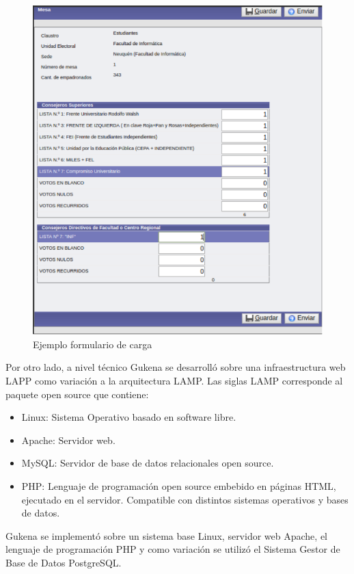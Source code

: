 \begin{figure}[h!]
  \includegraphics[width=\textwidth]{img/jvFvvu4LpJ.png}
  \caption{Ejemplo formulario de carga}
  \label{graf:formularioGukena}
\end{figure}

Por otro lado, a nivel técnico Gukena se desarrolló sobre una infraestructura web LAPP como variación a la arquitectura LAMP. Las siglas LAMP corresponde al paquete open source  \cite{chaparro2006lamp} que contiene: 
\begin{itemize}
    \item Linux: Sistema Operativo basado en software libre.
    \item Apache: Servidor web.
    \item MySQL: Servidor de base de datos relacionales open source.
    \item PHP: Lenguaje de programación open source embebido en páginas HTML, ejecutado en el servidor. Compatible con distintos sistemas operativos y bases de datos.
\end{itemize} Gukena se implementó sobre un sistema base Linux, servidor web Apache, el lenguaje de programación PHP y como variación se utilizó el Sistema Gestor de Base de Datos PostgreSQL. 


